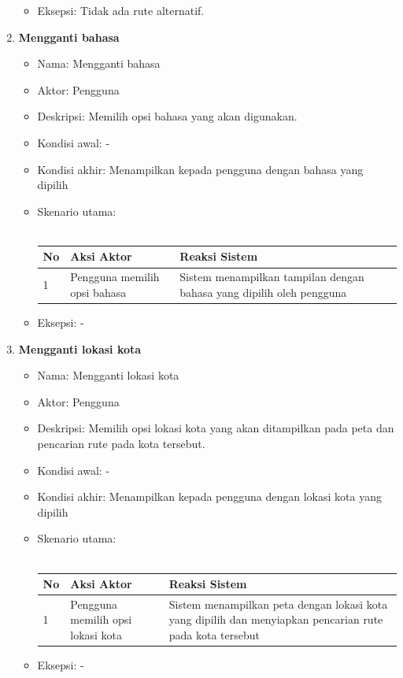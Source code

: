 \documentclass[a4paper,twoside]{article}
\begin{document}
\begin{enumerate}
\begin{itemize}
\begin{tabular}{|p{0.5cm} |p{6cm}| p{6cm}|}
						\end{tabular} 
			\item Eksepsi: Tidak ada rute alternatif.
		\end{itemize}
	\item \textbf{Mengganti bahasa}
	\begin{itemize}
			\item Nama: Mengganti bahasa
			\item Aktor: Pengguna
			\item Deskripsi: Memilih opsi bahasa yang akan digunakan.
			\item Kondisi awal: -
			\item Kondisi akhir: Menampilkan kepada pengguna dengan bahasa yang dipilih
			\item Skenario utama: \\ \\
				\begin{tabular}{|p{0.5cm} |p{6cm}| p{6cm}|}
						\hline
							No 	& Aksi Aktor & Reaksi Sistem \\ \hline
							1 	& Pengguna memilih opsi bahasa 	&	Sistem menampilkan tampilan dengan bahasa yang dipilih oleh pengguna \\ \hline 
						\end{tabular} 
			\item Eksepsi: -
		\end{itemize}
	\item \textbf{Mengganti lokasi kota}
	\begin{itemize}
			\item Nama: Mengganti lokasi kota
			\item Aktor: Pengguna
			\item Deskripsi: Memilih opsi lokasi kota yang akan ditampilkan pada peta dan pencarian rute pada kota tersebut.
			\item Kondisi awal: -
			\item Kondisi akhir: Menampilkan kepada pengguna dengan lokasi kota yang dipilih
			\item Skenario utama: \\ \\
				\begin{tabular}{|p{0.5cm} |p{6cm}| p{6cm}|}
						\hline
							No 	& Aksi Aktor & Reaksi Sistem \\ \hline
							1 	& Pengguna memilih opsi lokasi kota 	&	Sistem menampilkan peta dengan lokasi kota yang dipilih dan menyiapkan pencarian rute pada kota tersebut \\ \hline 
						\end{tabular} 
			\item Eksepsi: -
		\end{itemize}
\end{enumerate}
\end{document}
